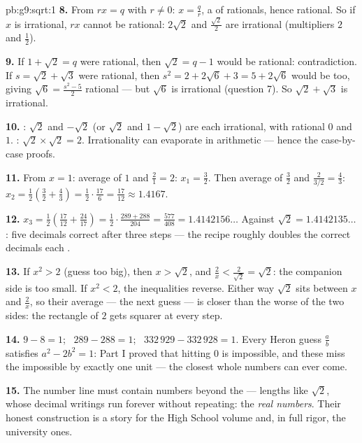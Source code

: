\begin{solution}{pb:g9:sqrt:1}
\textbf{8.} From $r x = q$ with $r \neq 0$:
$x = \frac qr$, a  of rationals, hence rational. So if
$x$ is irrational, $r x$ cannot be rational: $2\sqrt2$ and
$\frac{\sqrt2}{2}$ are irrational (multipliers $2$ and
$\frac12$).

\textbf{9.} If $1 + \sqrt2 = q$ were rational, then
$\sqrt2 = q - 1$ would be rational: contradiction. If
$s = \sqrt2 + \sqrt3$ were rational, then
$s^2 = 2 + 2\sqrt6 + 3 = 5 + 2\sqrt6$ would be too, giving
$\sqrt6 = \frac{s^2 - 5}{2}$ rational --- but $\sqrt6$ is
irrational (question 7). So $\sqrt2 + \sqrt3$ is irrational.

\textbf{10.} : $\sqrt2$ and $-\sqrt2$ (or $\sqrt2$ and
$1 - \sqrt2$) are each irrational, with rational  $0$ and
$1$. : $\sqrt2 \times \sqrt2 = 2$. Irrationality can
evaporate in arithmetic --- hence the case-by-case proofs.

\textbf{11.} From $x = 1$: average of $1$ and $\frac21 = 2$:
$x_1 = \frac32$. Then average of $\frac32$ and
$\frac{2}{3/2} = \frac43$:
$x_2 = \frac12\left(\frac32 + \frac43\right)
= \frac12 \cdot \frac{17}{6} = \frac{17}{12} \approx 1.4167$.

\textbf{12.} $x_3 = \frac12\left(\frac{17}{12} +
\frac{24}{17}\right) = \frac12 \cdot
\frac{289 + 288}{204} = \frac{577}{408} = 1.4142156\ldots$
Against $\sqrt2 = 1.4142135\ldots$: five decimals correct after
three steps --- the recipe roughly doubles the correct decimals
each .

\textbf{13.} If $x^2 > 2$ (guess too big), then $x > \sqrt2$,
and $\frac2x < \frac{2}{\sqrt2} = \sqrt2$: the companion side is
too small. If $x^2 < 2$, the inequalities reverse. Either way
$\sqrt2$ sits between $x$ and $\frac2x$, so their average ---
the next guess --- is closer than the worse of the two sides:
the rectangle of  $2$ gets squarer at every step.

\textbf{14.} $9 - 8 = 1$; \ $289 - 288 = 1$; \
$332\,929 - 332\,928 = 1$. Every Heron guess $\frac ab$
satisfies $a^2 - 2b^2 = 1$: Part I proved that hitting $0$ is
impossible, and these  miss the impossible by exactly
one unit --- the closest whole numbers can ever come.

\textbf{15.} The number line must contain numbers beyond the
 --- lengths like $\sqrt2$, whose decimal writings run
forever without repeating: the \emph{real numbers}. Their
honest construction is a story for the High School volume and,
in full rigor, the university ones.
\end{solution}
